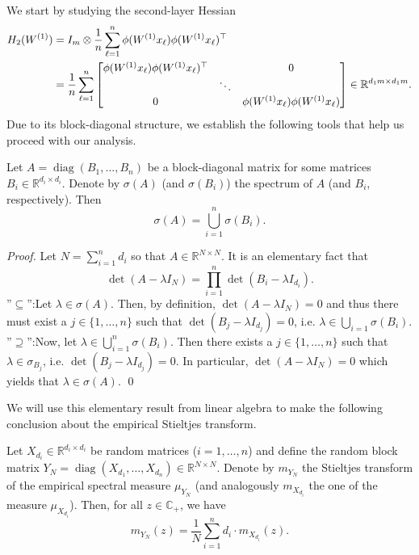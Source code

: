 \documentclass{article}
\begin{document}
We start by studying the second-layer Hessian
\begin{align}
H_2(W^{(1)})&=I_m\otimes\frac{1}{n}\sum_{\ell=1}^n\phi(W^{(1)}x_\ell)\phi(W^{(1)}x_\ell)^\top \notag
\\ &= \frac{1}{n}\sum_{\ell=1}^n\begin{bmatrix} \phi(W^{(1)}x_\ell)\phi(W^{(1)}x_\ell)^\top & & 0 \\ & \ddots & \\ 0 & & \phi(W^{(1)}x_\ell)\phi(W^{(1)}x_\ell) \end{bmatrix} \in\mathbb{R}^{d_1m\times d_1m}.
\end{align}
Due to its block-diagonal structure, we establish the following tools that help us proceed with our analysis.
\bigskip
\\
\begin{lemma}\label{thm:block-spectrum}
Let $A = \operatorname{diag}(B_1,\dots,B_n)$ be a block-diagonal matrix for some matrices $B_i\in\mathbb{R}^{d_i\times d_i}$. Denote by $\sigma(A)$ (and $\sigma(B_i)$) the spectrum of $A$ (and $B_i$, respectively). Then
$$\sigma(A)=\bigcup_{i=1}^n\sigma(B_i).$$
\end{lemma}
\smallskip
\noindent
\emph{Proof.} Let $N=\sum_{i=1}^n d_i$ so that $A\in\mathbb{R}^{N\times N}$. It is an elementary fact that
\begin{equation}
\det(A-\lambda I_N)=\prod_{i=1}^n\det(B_i-\lambda I_{d_i}).
\end{equation}
''$\subseteq$'':\quad Let $\lambda\in\sigma(A)$. Then, by definition, $\det(A-\lambda I_N)=0$ and thus there must exist a $j\in\{1,\dots,n\}$ such that $\det(B_j-\lambda I_{d_j})=0$, i.e. $\lambda\in\bigcup_{i=1}\sigma(B_i)$.
\smallskip
\\
''$\supseteq$'':\quad Now, let $\lambda\in\bigcup_{i=1}^n\sigma(B_i)$. Then there exists a $j\in\{1,\dots, n\}$ such that $\lambda\in\sigma_{B_j}$, i.e. $\det(B_j-\lambda I_{d_j})=0$. In particular, $\det(A-\lambda I_N)=0$ which yields that $\lambda\in\sigma(A)$.
\qed
\bigskip
\par
We will use this elementary result from linear algebra to make the following conclusion about the empirical Stieltjes transform.
\bigskip
\begin{proposition}\label{thm:finite-block-stieltjes}
Let $X_{d_i}\in\mathbb{R}^{d_i\times d_i}$ be random matrices ($i=1,\dots, n$) and define the random block matrix $Y_N=\operatorname{diag}(X_{d_1},\dots,X_{d_n})\in\mathbb{R}^{N\times N}$. Denote by $m_{Y_N}$ the Stieltjes transform of the empirical spectral measure $\mu_{Y_N}$ (and analogously $m_{X_{d_i}}$ the one of the measure $\mu_{X_{d_i}}$). Then, for all $z\in\mathbb{C}_+$, we have
$$m_{Y_N}(z)=\frac{1}{N}\sum_{i=1}^n d_i\cdot m_{X_{d_i}}(z).$$
\end{proposition}
\end{document}
